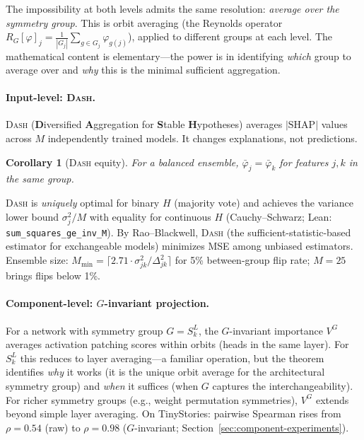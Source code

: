 \documentclass{article}
\newtheorem{corollary}[theorem]{Corollary}
\newcommand{\SHAP}{\mathrm{SHAP}}
\newcommand{\DASH}{\textsc{Dash}}
\begin{document}
The impossibility at both levels admits the same resolution: \emph{average over the symmetry group}. This is orbit averaging (the Reynolds operator $R_G[\varphi]_j = \frac{1}{|G_j|}\sum_{g \in G_j} \varphi_{g(j)}$), applied to different groups at each level. The mathematical content is elementary---the power is in identifying \emph{which} group to average over and \emph{why} this is the minimal sufficient aggregation.

\paragraph{Input-level: \DASH{}.}
\DASH{} (\textbf{D}iversified \textbf{A}ggregation for \textbf{S}table \textbf{H}ypotheses) averages $|\SHAP|$ values across $M$ independently trained models. It changes explanations, not predictions.

\begin{corollary}[\DASH{} equity]
\label{cor:equity}
For a balanced ensemble, $\bar\varphi_j = \bar\varphi_k$ for features $j, k$ in the same group.
\end{corollary}

\DASH{} is \emph{uniquely} optimal for binary $H$ (majority vote) and achieves the variance lower bound $\sigma_j^2/M$ with equality for continuous $H$ (Cauchy--Schwarz; Lean: \texttt{sum\_squares\_ge\_inv\_M}). By Rao--Blackwell, \DASH{} (the sufficient-statistic-based estimator for exchangeable models) minimizes MSE among unbiased estimators.
Ensemble size: $M_{\min} = \lceil 2.71 \cdot \sigma_{jk}^2/\Delta_{jk}^2 \rceil$ for 5\% between-group flip rate; $M = 25$ brings flips below 1\%.

\paragraph{Component-level: $G$-invariant projection.}
For a network with symmetry group $G = S_k^L$, the $G$-invariant importance $V^G$ averages activation patching scores within orbits (heads in the same layer). For $S_k^L$ this reduces to layer averaging---a familiar operation, but the theorem identifies \emph{why} it works (it is the unique orbit average for the architectural symmetry group) and \emph{when} it suffices (when $G$ captures the interchangeability). For richer symmetry groups (e.g., weight permutation symmetries), $V^G$ extends beyond simple layer averaging. On TinyStories: pairwise Spearman rises from $\rho = 0.54$ (raw) to $\rho = 0.98$ ($G$-invariant; Section~\ref{sec:component-experiments}).
\end{document}
